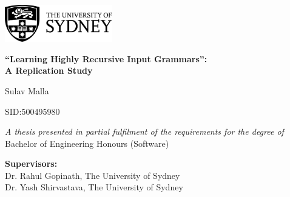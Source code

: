 \begin{titlepage}
    \vspace*{1cm}

    \begin{flushleft}
        \begin{center}
            \includegraphics[width=0.35\textwidth]{img/pre_chapters/usyd_logo_full.png}
    
        \vspace{3cm} 
    
        {\LARGE \textbf{\enquote{Learning Highly Recursive Input Grammars}:\\[3pt]A Replication Study}}
    
        \vspace{1.5cm} 
        
        {\Large Sulav Malla} 

        {\Large SID:500495980}



        

        \vfill
        
        \textit{A thesis presented in partial fulfilment of the requirements for the degree of\\[3pt]}
        Bachelor of Engineering Honours (Software)
        
        \vspace{2.75cm}
    
        \textbf{Supervisors:}\\
        Dr. Rahul Gopinath, The University of Sydney\\
        Dr. Yash Shirvastava, The University of Sydney
    

\end{center}
\end{flushleft}
\end{titlepage}
